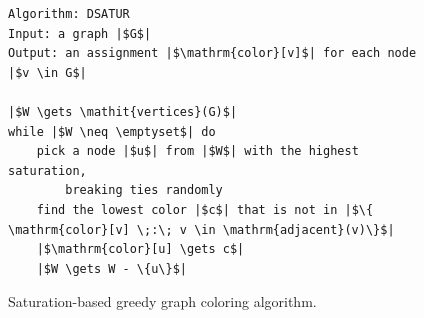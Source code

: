 \documentclass[11pt]{book}
\begin{document}
\begin{figure}[btp]
  \centering
\begin{lstlisting}[basicstyle=\rmfamily,deletekeywords={for,from,with,is,not,in,find},morekeywords={while},columns=fullflexible]
Algorithm: DSATUR
Input: a graph |$G$|
Output: an assignment |$\mathrm{color}[v]$| for each node |$v \in G$|

|$W \gets \mathit{vertices}(G)$|
while |$W \neq \emptyset$| do
    pick a node |$u$| from |$W$| with the highest saturation,
        breaking ties randomly
    find the lowest color |$c$| that is not in |$\{ \mathrm{color}[v] \;:\; v \in \mathrm{adjacent}(v)\}$|
    |$\mathrm{color}[u] \gets c$|
    |$W \gets W - \{u\}$|
\end{lstlisting}
  \caption{Saturation-based greedy graph coloring algorithm.}
  \label{fig:satur-algo}
\end{figure}
\end{document}
